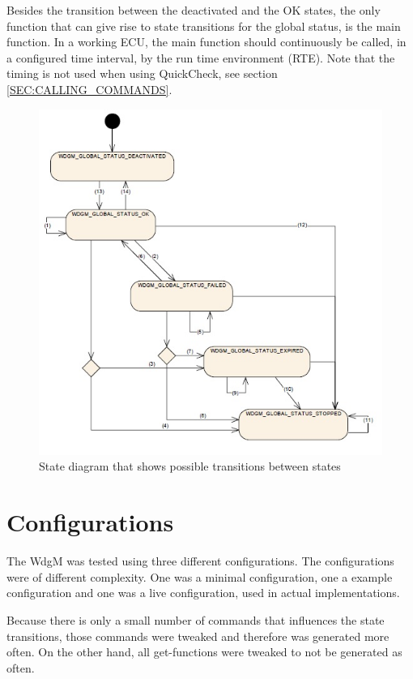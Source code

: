Besides the transition between the deactivated and the OK states, the only
function that can give rise to state transitions for the global status, is the
main function. In a working ECU, the main function should continuously be
called, in a configured time interval, by the run time environment (RTE). Note
that the timing is not used when using QuickCheck, see section
\ref{SEC:CALLING_COMMANDS}.

\begin{figure}[h!]
  \begin{center}
    \includegraphics{pictures/globalstatuses.jpg}
  \end{center}
  \caption{State diagram that shows possible transitions between states}
  \label{FIG:GLOBALSTATUSES}
\end{figure}

\section{Configurations}
The WdgM was tested using three different configurations. The configurations
were of different complexity. One was a minimal configuration, one a example
configuration and one was a live configuration, used in actual implementations.

Because there is only a small number of commands that influences the state
transitions, those commands were tweaked and therefore was generated more
often. On the other hand, all get-functions were tweaked to not be generated as often.


